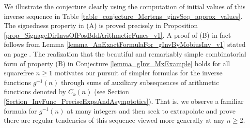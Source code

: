 \documentclass[11pt,reqno,a4letter]{article}
\numberwithin{figure}{section}
\numberwithin{table}{section}
\theoremstyle{plain}
\numberwithin{theorem}{section}
\theoremstyle{definition}
\begin{document}
We illustrate the conjecture clearly using the computation of initial values of 
this inverse sequence in 
Table \ref{table_conjecture_Mertens_ginvSeq_approx_values}. 
The signedness property in (A) is proved precisely in 
Proposition \ref{prop_SignageDirInvsOfPosBddArithmeticFuncs_v1}. 
A proof of (B) in fact follows from 
Lemma \ref{lemma_AnExactFormulaFor_gInvByMobiusInv_v1} 
stated on page \pageref{lemma_AnExactFormulaFor_gInvByMobiusInv_v1}. 
The realization that the beautiful and remarkably simple combinatorial form of property (B) 
in Conjecture \ref{lemma_gInv_MxExample} holds for all squarefree $n \geq 1$ 
motivates our pursuit of simpler formulas for the inverse functions $g^{-1}(n)$ 
through sums of auxiliary subsequences of arithmetic functions denoted by $C_k(n)$  
(see Section \ref{Section_InvFunc_PreciseExpsAndAsymptotics}). 
That is, we observe a familiar formula for $g^{-1}(n)$ at many integers and then seek 
to extrapolate and prove there are regular tendencies of this sequence viewed 
more generally at any $n \geq 2$. 
\end{document}
